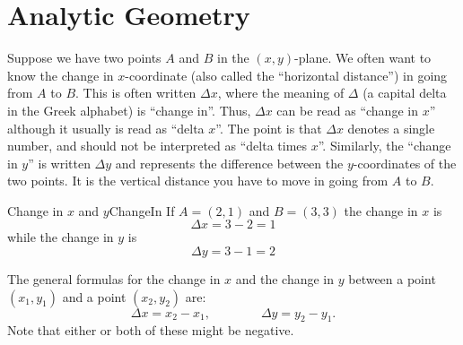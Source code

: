 \section{Analytic Geometry}\label{sec:AnalyticGeometry}

 


Suppose we have two points $A$ and $B$ in the $(x,y)$-plane.
We often want to know the change in $x$-coordinate (also called the
``horizontal distance'') in going from $A$ to $B$.  This is often
written $\Delta x$, where the meaning of $\Delta$ (a capital delta in
the Greek alphabet) is ``change in''. Thus, $\Delta x$ can be read as
``change in $x$'' although it usually is read as ``delta $x$''. The
point is that $\Delta x$ denotes a single number, and should not be
interpreted as ``delta times $x$''. Similarly, the ``change in $y$'' is written $\Delta y$
and represents the difference between the $y$-coordinates of the 
two points. It is the vertical distance you have to move in going from $A$ to $B$.

\begin{example}{Change in $x$ and $y$}{ChangeIn}\label{ChangeIn}
	If $A=(2,1)$ and $B=(3,3)$ the change in $x$ is
	$$\Delta x=3-2=1$$
	while the change in $y$ is
	$$\Delta y= 3-1=2$$
	\vspace{-0.5cm}
\end{example}

The general formulas for the change in $x$ and the change in $y$ 
between a point $(x_1,y_1)$ and a point $(x_2,y_2)$ are:
$$
\Delta x=x_2-x_1,\qquad\qquad\Delta y=y_2-y_1.
$$
Note that either or both of these might be negative.\\

